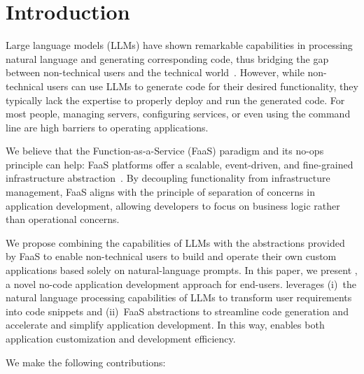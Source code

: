 \section{Introduction}
\label{sec:introduction}


Large language models (LLMs) have shown remarkable capabilities in processing natural language and generating corresponding code, thus bridging the gap between non-technical users and the technical world~\cite{liu2024your,vaithilingam2022expectation,ni2023lever,weisz2021perfection,xu2022ide,jin2024can,smith2020unleashing}.
However, while non-technical users can use LLMs to generate code for their desired functionality, they typically lack the expertise to properly deploy and run the generated code.
For most people, managing servers, configuring services, or even using the command line are high barriers to operating applications.

We believe that the Function-as-a-Service (FaaS) paradigm and its no-ops principle can help:
FaaS platforms offer a scalable, event-driven, and fine-grained infrastructure abstraction~\cite{gupta2023integration,macia2023serverless,paper_bermbach2021_cloud_engineering,kjorveziroski2021iot,gadepalli2019challenges,wen2021empirical,wolski2019cspot,pfandzelter2023serverless,schirmer2023nightshift,wang2023lotus,malekabbasi2024geofaas}.
By decoupling functionality from infrastructure management, FaaS aligns with the principle of separation of concerns in application development, allowing developers to focus on business logic rather than operational concerns.

We propose combining the capabilities of LLMs with the abstractions provided by FaaS to enable non-technical users to build and operate their own custom applications based solely on natural-language prompts.
In this paper, we present \sysname{}, a novel no-code application development approach for end-users.
\sysname{} leverages (i)~the natural language processing capabilities of LLMs to transform user requirements into code snippets and (ii)~FaaS abstractions to streamline code generation and accelerate and simplify application development.
In this way, \sysname{} enables both application customization and development efficiency.

We make the following contributions:

